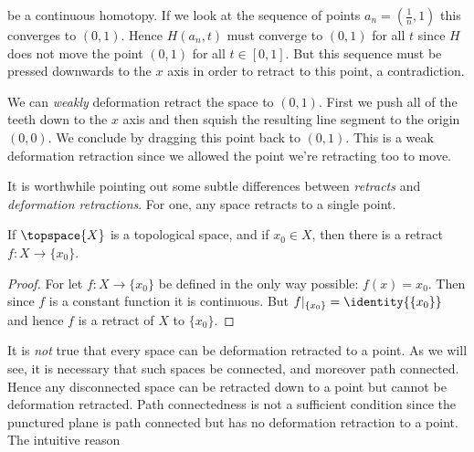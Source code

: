\documentclass{book}                                                           %
\begin{document}
                be a continuous homotopy. If we look at the sequence of points
                $a_{n}=(\frac{1}{n},1)$ this converges to $(0,1)$. Hence
                $H(a_{n},t)$ must converge to $(0,1)$ for all $t$ since $H$ does
                not move the point $(0,1)$ for all $t\in[0,1]$. But this
                sequence must be pressed downwards to the $x$ axis in order to
                retract to this point, a contradiction.
                \par\hfill\par
                We can \textit{weakly} deformation retract the space to $(0,1)$.
                First we push all of the teeth down to the $x$ axis and then
                squish the resulting line segment to the origin $(0,0)$. We
                conclude by dragging this point back to $(0,1)$. This is a
                weak deformation retraction since we allowed the point we're
                retracting too to move.
                \par\hfill\par
                It is worthwhile pointing out some subtle differences between
                \textit{retracts} and \textit{deformation retractions}. For one,
                any space retracts to a single point.
                \begin{theorem}
                    If $\topspace{X}$ is a topological space, and if
                    $x_{0}\in{X}$, then there is a retract
                    $f:X\rightarrow\{x_{0}\}$.
                \end{theorem}
                \begin{proof}
                    For let $f:X\rightarrow\{x_{0}\}$ be defined in the only way
                    possible: $f(x)=x_{0}$. Then since $f$ is a constant
                    function it is continuous. But
                    $f|_{\{x_{0}\}}=\identity{\{x_{0}\}}$ and hence $f$ is a
                    retract of $X$ to $\{x_{0}\}$.
                \end{proof}
                It is \textit{not} true that every space can be deformation
                retracted to a point. As we will see, it is necessary that
                such spaces be connected, and moreover path connected. Hence any
                disconnected space can be retracted down to a point but cannot
                be deformation retracted. Path connectedness is not a sufficient
                condition since the punctured plane is path connected but has
                no deformation retraction to a point. The intuitive reason
\end{document}
